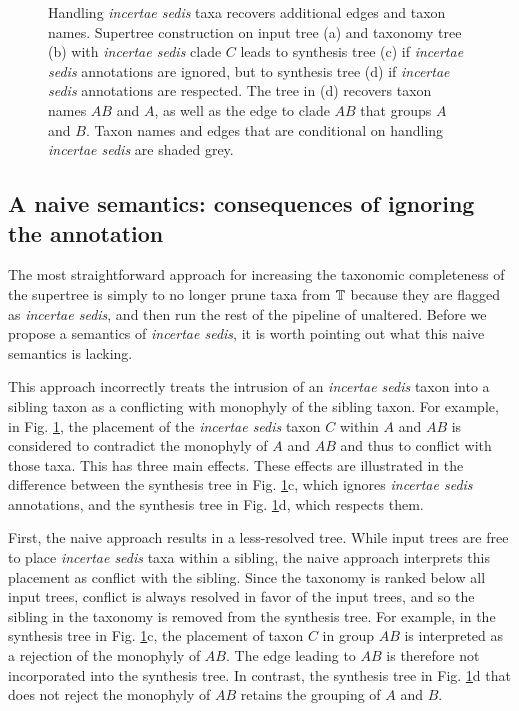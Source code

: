\documentclass[english]{article}
\begin{document}
\begin{figure}
{}

\caption{\label{fig:Handling-incertae-sedis}Handling \emph{incertae sedis
}taxa recovers additional edges and taxon names.
Supertree construction on input tree (a) and taxonomy tree (b) with \emph{incertae sedis}
clade $C$ leads to synthesis tree (c) if \emph{incertae sedis} annotations are
ignored, but to synthesis tree (d) if \emph{incertae sedis} annotations are respected.
The tree in (d) recovers taxon names $AB$ and $A$, as well as the edge to clade $AB$
that groups $A$ and $B$. Taxon names and edges that are conditional on handling
\emph{incertae sedis}
are shaded grey.
}

\end{figure}

\subsection{A naive semantics: consequences of ignoring the annotation}

The most straightforward approach for increasing the taxonomic completeness of
the supertree is simply to no longer prune taxa from $\mbox{\ensuremath{\mathbb{T}}}$ because they are flagged
as \emph{incertae sedis}, and then run the rest of the pipeline of
\citet{redelings2017supertree} unaltered.  Before we propose a semantics of
\emph{incertae sedis}, it is worth pointing out what this naive semantics is lacking.

This approach incorrectly treats the intrusion of an \emph{incertae sedis} taxon
into a sibling taxon as a conflicting with monophyly of the sibling taxon. For
example, in Fig. \ref{fig:Handling-incertae-sedis}, the placement of the
\emph{incertae sedis} taxon $C$ within $A$ and $AB$ is considered
to contradict the monophyly of $A$ and $AB$ and thus to conflict with those taxa.
This has three main effects.  These effects are illustrated in the difference
between the synthesis tree in Fig. \ref{fig:Handling-incertae-sedis}c, which
ignores \emph{incertae sedis} annotations, and the synthesis tree in Fig.
\ref{fig:Handling-incertae-sedis}d, which respects them.

First, the naive approach results in a less-resolved tree.  While input trees are
free to place \emph{incertae sedis} taxa within a sibling, the naive approach
interprets this placement as conflict with the sibling.  Since the taxonomy
is ranked below all input trees, conflict is always resolved in favor of the
input trees, and so the sibling in the taxonomy is removed from the synthesis
tree.  For example, in the synthesis tree in Fig.
\ref{fig:Handling-incertae-sedis}c, the placement of taxon $C$ in group $AB$ is
interpreted as a rejection of the monophyly of $AB$. The edge leading to $AB$ is
therefore not incorporated into the synthesis tree.  In contrast, the synthesis
tree in Fig. \ref{fig:Handling-incertae-sedis}d that does not reject the
monophyly of $AB$ retains the grouping of $A$ and $B$.
\end{document}
